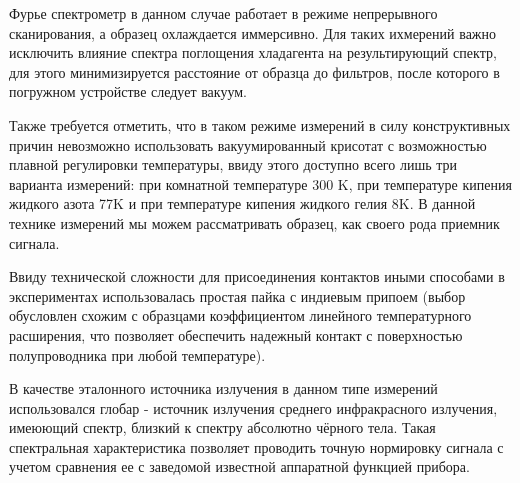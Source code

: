 \documentclass[../main.tex]{subfiles}
\begin{document}
    Фурье спектрометр в данном случае работает в режиме непрерывного сканирования, а образец охлаждается иммерсивно.
    Для таких ихмерений важно исключить влияние спектра поглощения хладагента на результирующий спектр, для этого
    минимизируется расстояние от образца до фильтров, после которого в погружном устройстве следует вакуум.
    
    Также требуется отметить, что в таком режиме измерений в силу конструктивных причин невозможно использовать вакуумированный
    крисотат с возможностью плавной регулировки температуры, ввиду этого доступно всего лишь три варианта измерений:
    при комнатной температуре 300 K, при температуре кипения жидкого азота 77K и при температуре кипения жидкого гелия 8K. В
    данной технике измерений мы можем рассматривать образец, как своего рода приемник сигнала. 
    
    Ввиду технической сложности для присоединения контактов иными способами в экспериментах использовалась простая пайка
    с индиевым припоем (выбор обусловлен схожим с образцами коэффициентом линейного температурного расширения, что позволяет 
    обеспечить надежный контакт с поверхностью полупроводника при любой температуре).

    В качестве эталонного источника излучения в данном типе измерений использовался глобар - источник излучения среднего 
    инфракрасного излучения, имеюющий спектр, близкий к спектру абсолютно чёрного тела. Такая спектральная характеристика
    позволяет проводить точную нормировку сигнала с учетом сравнения ее с заведомой известной аппаратной
    функцией прибора.
    
\end{document}
